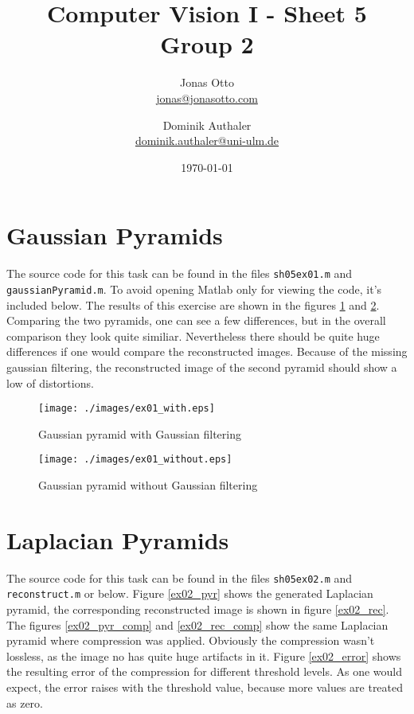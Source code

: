 \documentclass{article}
\title{Computer Vision I - Sheet 5\\Group 2\\}
\author{ Jonas Otto\\ \href{mailto:jonas@jonasotto.com}{jonas@jonasotto.com} \and Dominik Authaler \\ 
\href{mailto:dominik.authaler@uni-ulm.de}{dominik.authaler@uni-ulm.de}
}
\date{\today}
\begin{document}
\maketitle

\newpage

\section{Gaussian Pyramids}
The source code for this task can be found in the files \texttt{sh05ex01.m} and \texttt{gaussianPyramid.m}. To avoid opening Matlab only for viewing the code, it's included below. 
The results of this exercise are shown in the figures \ref{ex01_with} and \ref{ex01_without}. Comparing the two pyramids, one can see a few differences, but in the overall comparison they look quite similiar.
Nevertheless there should be quite huge differences if one would compare the reconstructed images. Because of the missing gaussian filtering, the reconstructed image of the second pyramid should show a low of distortions. 
\begin{figure}[H]
  \begin{center}
    \texttt{[image: ./images/ex01\_with.eps]}
    \caption{Gaussian pyramid with Gaussian filtering}
    \label{ex01_with}
  \end{center}
\end{figure}

\begin{figure}[H]
  \begin{center}
    \texttt{[image: ./images/ex01\_without.eps]}
    \caption{Gaussian pyramid without Gaussian filtering}
    \label{ex01_without}
  \end{center}
\end{figure}

\hspace{20mm}


\hspace{20mm}




\clearpage
\section{Laplacian Pyramids}
The source code for this task can be found in the files \texttt{sh05ex02.m} and \texttt{reconstruct.m} or below. Figure \ref{ex02_pyr} shows the generated Laplacian pyramid, the corresponding reconstructed image is shown in figure \ref{ex02_rec}. The figures \ref{ex02_pyr_comp} and \ref{ex02_rec_comp} show the same Laplacian pyramid where compression was applied. Obviously the compression wasn't lossless, as the image no has quite huge artifacts in it. 
Figure \ref{ex02_error} shows the resulting error of the compression for different threshold levels. As one would expect, the error raises with the threshold value, because more values are treated as zero. 
\end{document}
